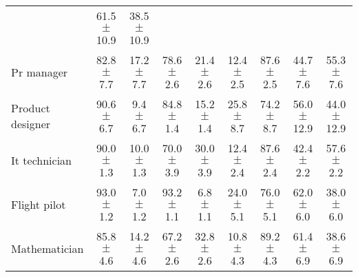 \begin{table*}[p]
{\begin{tabular}{l|cc|cc|cc|cc}
& 61.5 $\pm$ 10.9 & 38.5 $\pm$ 10.9
\\
Pr manager
& 82.8 $\pm$ 7.7 & 17.2 $\pm$ 7.7
& 78.6 $\pm$ 2.6 & 21.4 $\pm$ 2.6
& 12.4 $\pm$ 2.5 & 87.6 $\pm$ 2.5
& 44.7 $\pm$ 7.6 & 55.3 $\pm$ 7.6
\\
Product designer
& 90.6 $\pm$ 6.7 & 9.4 $\pm$ 6.7
& 84.8 $\pm$ 1.4 & 15.2 $\pm$ 1.4
& 25.8 $\pm$ 8.7 & 74.2 $\pm$ 8.7
& 56.0 $\pm$ 12.9 & 44.0 $\pm$ 12.9
\\
It technician
& 90.0 $\pm$ 1.3 & 10.0 $\pm$ 1.3
& 70.0 $\pm$ 3.9 & 30.0 $\pm$ 3.9
& 12.4 $\pm$ 2.4 & 87.6 $\pm$ 2.4
& 42.4 $\pm$ 2.2 & 57.6 $\pm$ 2.2
\\
Flight pilot
& 93.0 $\pm$ 1.2 & 7.0 $\pm$ 1.2
& 93.2 $\pm$ 1.1 & 6.8 $\pm$ 1.1
& 24.0 $\pm$ 5.1 & 76.0 $\pm$ 5.1
& 62.0 $\pm$ 6.0 & 38.0 $\pm$ 6.0
\\
Mathematician
& 85.8 $\pm$ 4.6 & 14.2 $\pm$ 4.6
& 67.2 $\pm$ 2.6 & 32.8 $\pm$ 2.6
& 10.8 $\pm$ 4.3 & 89.2 $\pm$ 4.3
& 61.4 $\pm$ 6.9 & 38.6 $\pm$ 6.9
\\

\bottomrule
\end{tabular}
}
\label{appendix:results-gender-part1}
\end{table*}